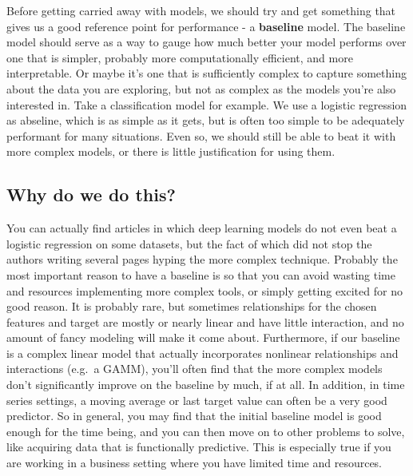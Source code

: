 \documentclass[
  letterpaper,
]{krantz}
\begin{document}
Before getting carried away with models, we should try and get something
that gives us a good reference point for performance - a
\textbf{baseline} model. The baseline model should serve as a way to
gauge how much better your model performs over one that is simpler,
probably more computationally efficient, and more interpretable. Or
maybe it's one that is sufficiently complex to capture something about
the data you are exploring, but not as complex as the models you're also
interested in. Take a classification model for example. We use a
logistic regression as abseline, which is as simple as it gets, but is
often too simple to be adequately performant for many situations. Even
so, we should still be able to beat it with more complex models, or
there is little justification for using them.

\subsection{Why do we do this?}\label{why-do-we-do-this}

You can actually find articles in which deep learning models do not even
beat a logistic regression on some datasets, but the fact of which did
not stop the authors writing several pages hyping the more complex
technique. Probably the most important reason to have a baseline is so
that you can avoid wasting time and resources implementing more complex
tools, or simply getting excited for no good reason. It is probably
rare, but sometimes relationships for the chosen features and target are
mostly or nearly linear and have little interaction, and no amount of
fancy modeling will make it come about. Furthermore, if our baseline is
a complex linear model that actually incorporates nonlinear
relationships and interactions (e.g.~a GAMM), you'll often find that the
more complex models don't significantly improve on the baseline by much,
if at all. In addition, in time series settings, a moving average or
last target value can often be a very good predictor. So in general, you
may find that the initial baseline model is good enough for the time
being, and you can then move on to other problems to solve, like
acquiring data that is functionally predictive. This is especially true
if you are working in a business setting where you have limited time and
resources.
\end{document}
